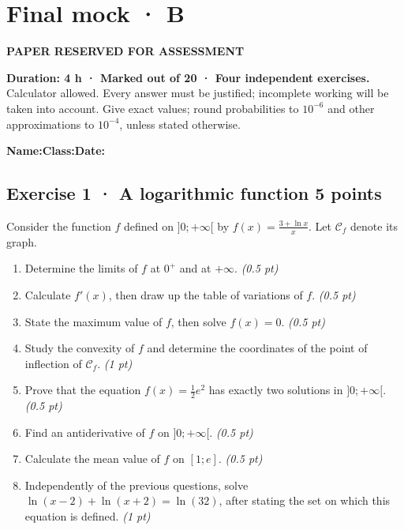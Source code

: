 \fi

\fi

\ifprof

\clearpage{}\label{sujet:9-4}

\section*{Final mock · B}

{\sffamily\bfseries\color{amber}PAPER RESERVED FOR ASSESSMENT\par}

\textbf{Duration: 4 h · Marked out of 20 · Four independent exercises.}\\Calculator allowed. Every answer must be justified; incomplete working will be taken into account. Give exact values; round probabilities to $10^{-6}$ and other approximations to $10^{-4}$, unless stated otherwise.

\smallskip\textbf{Name:}\enspace\dotfill\quad\textbf{Class:}\enspace\dotfill\quad\textbf{Date:}\enspace\dotfill

\subsection*{Exercise 1 · A logarithmic function \hfill 5 points}Consider the function $f$ defined on $]0;+\infty[$ by $f(x)=\frac{3+\ln x}x$. Let $\mathcal C_f$ denote its graph.

\begin{enumerate}

\item Determine the limits of $f$ at $0^+$ and at $+\infty$. \hfill\textit{(0.5 pt)}

\item Calculate $f' (x)$, then draw up the table of variations of $f$. \hfill\textit{(0.5 pt)}

\item State the maximum value of $f$, then solve $f(x)=0$. \hfill\textit{(0.5 pt)}

\item Study the convexity of $f$ and determine the coordinates of the point of inflection of $\mathcal C_f$. \hfill\textit{(1 pt)}

\item Prove that the equation $f(x)=\frac12 e^{2}$ has exactly two solutions in $]0;+\infty[$. \hfill\textit{(0.5 pt)}

\item Find an antiderivative of $f$ on $]0;+\infty[$. \hfill\textit{(0.5 pt)}

\item Calculate the mean value of $f$ on $[1;e]$. \hfill\textit{(0.5 pt)}

\item Independently of the previous questions, solve $\ln(x-2)+\ln(x+2)=\ln(32)$, after stating the set on which this equation is defined. \hfill\textit{(1 pt)}

\end{enumerate}

